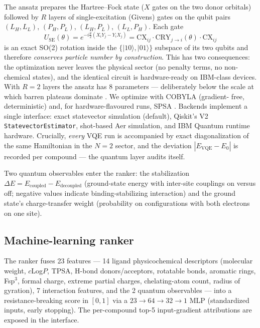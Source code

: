 \documentclass[10pt,twocolumn]{article}
\begin{document}
The ansatz prepares the Hartree--Fock state ($X$ gates on the two donor orbitals)
followed by $R$ layers of single-excitation (Givens) gates on the qubit pairs
$(L_H,L_L)$, $(P_H,P_L)$, $(L_H,P_L)$, $(L_L,P_H)$. Each gate
\begin{equation}
U_{\mathrm{SE}}(\theta) = e^{-i\frac{\theta}{2}(X_i Y_j - Y_i X_j)}
= \mathrm{CX}_{ij}\cdot \mathrm{CRY}_{j\to i}(\theta)\cdot \mathrm{CX}_{ij}
\label{eq:excitation}
\end{equation}
is an exact SO(2) rotation inside the $\{|10\rangle,|01\rangle\}$ subspace of its two
qubits and therefore \emph{conserves particle number by construction}. This has two
consequences: the optimization never leaves the physical sector (no penalty terms, no
non-chemical states), and the identical circuit is hardware-ready on IBM-class devices.
With $R{=}2$ layers the ansatz has 8 parameters --- deliberately below the scale at
which barren plateaus dominate \cite{mcclean2018}. We optimize with COBYLA (gradient-
free, deterministic) and, for hardware-flavoured runs, SPSA \cite{spall1992}.
Backends implement a single interface: exact statevector simulation (default),
Qiskit's V2 \texttt{StatevectorEstimator}, shot-based Aer simulation, and IBM Quantum
runtime hardware. Crucially, \emph{every} VQE run is accompanied by exact
diagonalization of the same Hamiltonian in the $N{=}2$ sector, and the deviation
$|E_{\mathrm{VQE}} - E_0|$ is recorded per compound --- the quantum layer audits itself.

Two quantum observables enter the ranker: the stabilization
$\Delta E = E_{\mathrm{coupled}} - E_{\mathrm{decoupled}}$ (ground-state energy with
inter-site couplings on versus off; negative values indicate binding-stabilizing
interaction) and the ground state's charge-transfer weight (probability on
configurations with both electrons on one site).

\subsection{Machine-learning ranker}

The ranker fuses 23 features --- 14 ligand physicochemical descriptors (molecular
weight, $c$Log$P$, TPSA, H-bond donors/acceptors, rotatable bonds, aromatic rings,
Fsp$^3$, formal charge, extreme partial charges, chelating-atom count, radius of
gyration), 7 interaction features, and the 2 quantum observables --- into a
resistance-breaking score in $[0,1]$ via a $23{\to}64{\to}32{\to}1$ MLP
(standardized inputs, early stopping). The per-compound top-5 input-gradient
attributions are exposed in the interface.
\end{document}
